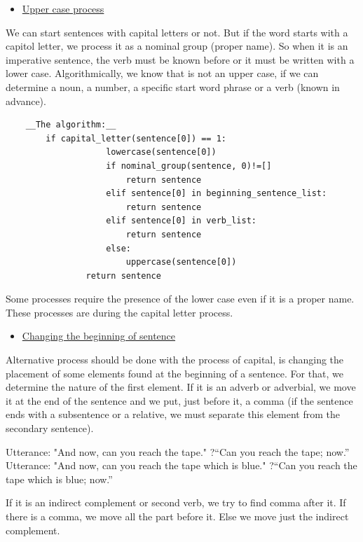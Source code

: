 \documentclass[twoside,a4paper,10pt]{report}
\begin{document}
\begin{itemize}
    \item  \underline{Upper case process}
\end{itemize}
We can start sentences with capital letters or not. But if the word starts with a capitol letter, we process it as a nominal group (proper name). So when it is an imperative sentence, the verb must be known before or it must be written with a lower case.
Algorithmically, we know that is not an upper case, if we can determine a noun, a number, a specific start word phrase or a verb (known in advance).



\lstset{language=python}
\begin{lstlisting}
	__The algorithm:__
		if capital_letter(sentence[0]) == 1:
                    lowercase(sentence[0])
                    if nominal_group(sentence, 0)!=[]
                        return sentence
                    elif sentence[0] in beginning_sentence_list:
                        return sentence
                    elif sentence[0] in verb_list:
                        return sentence
                    else:
                        uppercase(sentence[0])
                return sentence

\end{lstlisting}

Some processes require the presence of the lower case even if it is a proper name. These processes are during the capital letter process.



\begin{itemize}
    \item  \underline{Changing the beginning of sentence}
\end{itemize}
Alternative process should be done with the process of capital, is changing the placement of some elements found at the beginning of a sentence. For that, we determine the nature of the first element. If it is an adverb or adverbial, we move it at the end of the sentence and we put, just before it, a comma (if the sentence ends with a subsentence or a relative, we must separate this element from the secondary sentence).


\small
\begin{verbatimtab}
  Utterance: "And now, can you reach the tape."
  ?“Can you reach the tape; now.”
  Utterance: "And now, can you reach the tape which is blue."
  ?“Can you reach the tape which is blue; now.”
\end{verbatimtab}
\normalsize
If it is an indirect complement or second verb, we try to find comma after it. If there is a comma, we move all the part before it. Else we move just the indirect complement. 
\end{document}
